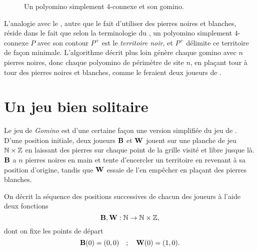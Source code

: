 \begin{figure}[h]
\centering
{} 
\hspace{.5cm}

\caption{Un polyomino simplement $4$-connexe et son gomino.}\label{fig:polyomino-et-gomino}
\end{figure}

L'analogie avec le \Go, autre que le fait d'utiliser des pierres noires et blanches, réside dans le fait que selon la terminologie du \Go, un polyomino simplement $4$-connexe $P$ avec son contour $P^+$ est le \emph{territoire noir}, et $P^+$ délimite ce territoire de façon minimale. L'algorithme décrit plus loin génère chaque gomino avec $n$ pierres noires, donc chaque polyomino de périmètre de site $n$, en plaçant tour à tour des pierres noires et blanches, comme le feraient deux joueurs de \Go.


\section{Un jeu bien solitaire}

Le jeu de \textit{Gomino} est d'une certaine façon une version simplifiée du jeu de \Go. D'une position initiale, deux joueurs $\mathbf{B}$ et $\mathbf{W}$ jouent sur une planche de jeu $\mathbb{N} \times \mathbb{Z}$ en laissant des pierres sur chaque point de la grille visité et libre jusque là. $\mathbf{B}$ a $n$ pierres noires en main et tente d'encercler un territoire en revenant à sa position d'origine, tandis que $\mathbf{W}$ essaie de l'en empêcher en plaçant des pierres blanches.

On décrit la séquence des positions successives de chacun des joueurs à l'aide deux fonctions
\[\mathbf{B}, \mathbf{W}: \mathbb{N} \to \mathbb{N}\times\mathbb{Z},\]
dont on fixe les points de départ
\begin{equation}\label{CI}
\mathbf{B}(0)= (0,0)  \quad;\quad
\mathbf{W}(0) = (1,0).
\end{equation}

